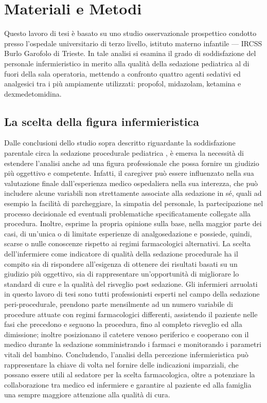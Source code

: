 \chapter{Materiali e Metodi}

Questo lavoro di tesi è basato su uno studio osservazionale prospettico condotto presso l'ospedale universitario di terzo livello, istituto materno infantile --- IRCSS Burlo Garofolo di Trieste. In tale analisi si esamina il grado di soddisfazione del personale infermieristico in merito alla qualità della sedazione pediatrica al di fuori della sala operatoria, mettendo a confronto quattro agenti sedativi ed analgesici tra i più ampiamente utilizzati: propofol, midazolam, ketamina e dexmedetomidina. 

\section{La scelta della figura infermieristica}
Dalle conclusioni dello studio sopra descritto riguardante la soddisfazione parentale circa la sedazione procedurale pediatrica \cite{Cortellazzo2022}, è emersa la necessità di estendere l'analisi anche ad una figura professionale che possa fornire un giudizio più oggettivo e competente. Infatti, il caregiver può essere influenzato nella sua valutazione finale dall'esperienza medico ospedaliera nella sua interezza, che può includere alcune variabili non strettamente associate alla sedazione in sé, quali ad esempio la facilità di parcheggiare, la simpatia del personale, la partecipazione nel processo decisionale ed eventuali problematiche specificatamente collegate alla procedura. Inoltre, esprime la propria opinione sulla base, nella maggior parte dei casi, di un'unica o di limitate esperienze di analgosedazione e possiede, quindi, scarse o nulle conoscenze rispetto ai regimi farmacologici alternativi. 
La scelta dell'infermiere come indicatore di qualità della sedazione procedurale ha il compito sia di rispondere all'esigenza di ottenere dei risultati basati su un giudizio più oggettivo, sia di rappresentare un'opportunità di migliorare lo standard di cure e la qualità del risveglio post sedazione. Gli infermieri arruolati in questo lavoro di tesi sono tutti professionisti esperti nel campo della sedazione peri-procedurale, prendono parte mensilmente ad un numero variabile di procedure attuate con regimi farmacologici differenti, assistendo il paziente nelle fasi che precedono e seguono la procedura, fino al completo risveglio ed alla dimissione; inoltre posizionano il catetere venoso periferico e cooperano con il medico durante la sedazione somministrando i farmaci e monitorando i parametri vitali del bambino. Concludendo, l'analisi della percezione infermieristica può rappresentare la chiave di volta nel fornire delle indicazioni imparziali, che possano essere utili al sedatore per la scelta farmacologica, oltre a potenziare la collaborazione tra medico ed infermiere e garantire al paziente ed alla famiglia una sempre maggiore attenzione alla qualità di cura.


